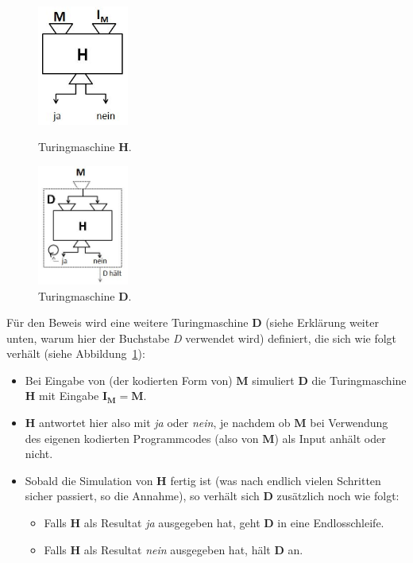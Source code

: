 \begin{figure}[h]
\begin{minipage}[h]{0.475\textwidth}
\centering
\includegraphics[width=3cm]{img/haltingproblem1.jpg}
    \caption{Turingmaschine $\mathbf{H}$.}
    \label{fig:haltingproblem1}
\end{minipage}
%
\begin{minipage}[h]{0.475\textwidth}
\centering
\includegraphics[width=3cm]{img/haltingproblem2.jpg}
    \caption{Turingmaschine $\mathbf{D}$.}
    \label{fig:haltingproblem2}
\end{minipage}
\end{figure}

F\"{u}r den Beweis wird eine weitere Turingmaschine $\mathbf{D}$ (siehe Erkl\"{a}rung weiter unten, warum hier der Buchstabe \emph{D} verwendet wird) definiert, die sich wie folgt verh\"{a}lt (siehe Abbildung~\ref{fig:haltingproblem2}):
\begin{itemize}
  \item Bei Eingabe von (der kodierten Form von) $\mathbf{M}$ simuliert $\mathbf{D}$  die Turingmaschine $\mathbf{H}$ mit Eingabe $\mathbf{I_M = M}$.
  \item $\mathbf{H}$ antwortet hier also mit \emph{ja} oder \emph{nein}, je nachdem ob $\mathbf{M}$ bei Verwendung des eigenen kodierten Programmcodes (also von $\mathbf{M}$) als Input anh\"{a}lt oder nicht.
  \item Sobald die Simulation von $\mathbf{H}$ fertig ist (was nach endlich vielen Schritten sicher passiert, so die Annahme), so verh\"{a}lt sich $\mathbf{D}$ zus\"{a}tzlich noch wie folgt:
    \begin{itemize}
      \item Falls $\mathbf{H}$ als Resultat \emph{ja} ausgegeben hat, geht $\mathbf{D}$ in eine Endlosschleife.
      \item Falls $\mathbf{H}$ als Resultat \emph{nein} ausgegeben hat, h\"{a}lt $\mathbf{D}$  an.
    \end{itemize}
\end{itemize}

